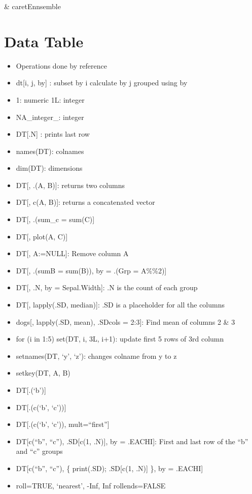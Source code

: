 \documentclass[]{book}
\begin{document}
\& caretEnnsemble

\section{Data Table}\label{data-table}

\begin{itemize}
\item
  Operations done by reference
\item
  dt{[}i, j, by{]} : subset by i calculate by j grouped using by
\item
  1: numeric \textbar{} 1L: integer
\item
  NA\_integer\_: integer
\item
  DT{[}.N{]} : prints last row
\item
  names(DT): colnames
\item
  dim(DT): dimensions
\item
  DT{[}, .(A, B){]}: returns two columns
\item
  DT{[}, c(A, B){]}: returns a concatenated vector
\item
  DT{[}, .(sum\_c = sum(C){]}
\item
  DT{[}, plot(A, C){]}
\item
  DT{[}, A:=NULL{]}: Remove column A
\item
  DT{[}, .(sumB = sum(B)), by = .(Grp = A\%\%2){]}
\item
  DT{[}, .N, by = Sepal.Width{]}: .N is the count of each group
\item
  DT{[}, lapply(.SD, median){]}: .SD is a placeholder for all the
  columns
\item
  dogs{[}, lapply(.SD, mean), .SDcols = 2:3{]}: Find mean of columns 2
  \& 3
\item
  for (i in 1:5) set(DT, i, 3L, i+1): update first 5 rows of 3rd column
\item
  setnames(DT, `y', `z'): changes colname from y to z
\item
  setkey(DT, A, B)
\item
  DT{[}.(`b'){]}
\item
  DT{[}.(c(`b', `c')){]}
\item
  DT{[}.(c(`b', `c')), mult=``first''{]}
\item
  DT{[}c(``b'', ``c''), .SD{[}c(1, .N){]}, by = .EACHI{]}: First and
  last row of the ``b'' and ``c'' groups
\item
  DT{[}c(``b'', ``c''), \{ print(.SD); .SD{[}c(1, .N){]} \}, by =
  .EACHI{]}
\item
  roll=TRUE, `nearest', -Inf, Inf \textbar{} rollends=FALSE
\end{itemize}
\end{document}
